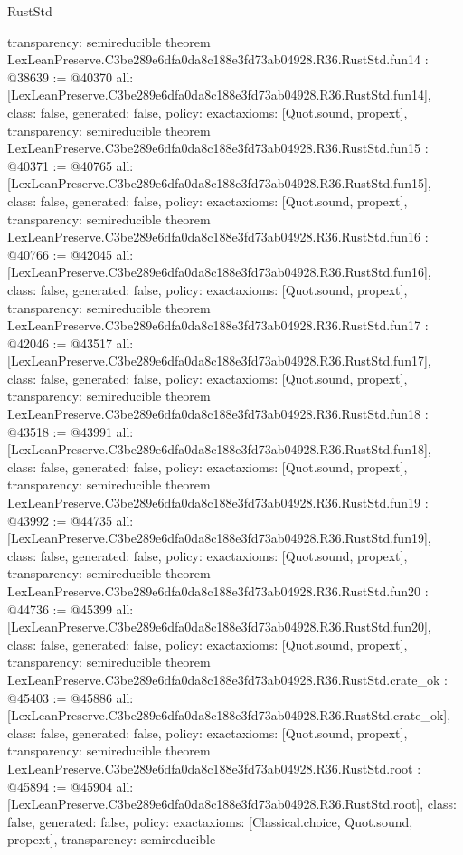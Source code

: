 \begin{lexlean}{RustStd}
\begin{coremodule}
{  transparency: semireducible
}
theorem LexLeanPreserve.C3be289e6dfa0da8c188e3fd73ab04928.R36.RustStd.fun14 : @38639 := @40370 {
  all: [LexLeanPreserve.C3be289e6dfa0da8c188e3fd73ab04928.R36.RustStd.fun14],
  class: false,
  generated: false,
  policy: exact{axioms: [Quot.sound, propext]},
  transparency: semireducible
}
theorem LexLeanPreserve.C3be289e6dfa0da8c188e3fd73ab04928.R36.RustStd.fun15 : @40371 := @40765 {
  all: [LexLeanPreserve.C3be289e6dfa0da8c188e3fd73ab04928.R36.RustStd.fun15],
  class: false,
  generated: false,
  policy: exact{axioms: [Quot.sound, propext]},
  transparency: semireducible
}
theorem LexLeanPreserve.C3be289e6dfa0da8c188e3fd73ab04928.R36.RustStd.fun16 : @40766 := @42045 {
  all: [LexLeanPreserve.C3be289e6dfa0da8c188e3fd73ab04928.R36.RustStd.fun16],
  class: false,
  generated: false,
  policy: exact{axioms: [Quot.sound, propext]},
  transparency: semireducible
}
theorem LexLeanPreserve.C3be289e6dfa0da8c188e3fd73ab04928.R36.RustStd.fun17 : @42046 := @43517 {
  all: [LexLeanPreserve.C3be289e6dfa0da8c188e3fd73ab04928.R36.RustStd.fun17],
  class: false,
  generated: false,
  policy: exact{axioms: [Quot.sound, propext]},
  transparency: semireducible
}
theorem LexLeanPreserve.C3be289e6dfa0da8c188e3fd73ab04928.R36.RustStd.fun18 : @43518 := @43991 {
  all: [LexLeanPreserve.C3be289e6dfa0da8c188e3fd73ab04928.R36.RustStd.fun18],
  class: false,
  generated: false,
  policy: exact{axioms: [Quot.sound, propext]},
  transparency: semireducible
}
theorem LexLeanPreserve.C3be289e6dfa0da8c188e3fd73ab04928.R36.RustStd.fun19 : @43992 := @44735 {
  all: [LexLeanPreserve.C3be289e6dfa0da8c188e3fd73ab04928.R36.RustStd.fun19],
  class: false,
  generated: false,
  policy: exact{axioms: [Quot.sound, propext]},
  transparency: semireducible
}
theorem LexLeanPreserve.C3be289e6dfa0da8c188e3fd73ab04928.R36.RustStd.fun20 : @44736 := @45399 {
  all: [LexLeanPreserve.C3be289e6dfa0da8c188e3fd73ab04928.R36.RustStd.fun20],
  class: false,
  generated: false,
  policy: exact{axioms: [Quot.sound, propext]},
  transparency: semireducible
}
theorem LexLeanPreserve.C3be289e6dfa0da8c188e3fd73ab04928.R36.RustStd.crate_ok : @45403 := @45886 {
  all: [LexLeanPreserve.C3be289e6dfa0da8c188e3fd73ab04928.R36.RustStd.crate_ok],
  class: false,
  generated: false,
  policy: exact{axioms: [Quot.sound, propext]},
  transparency: semireducible
}
theorem LexLeanPreserve.C3be289e6dfa0da8c188e3fd73ab04928.R36.RustStd.root : @45894 := @45904 {
  all: [LexLeanPreserve.C3be289e6dfa0da8c188e3fd73ab04928.R36.RustStd.root],
  class: false,
  generated: false,
  policy: exact{axioms: [Classical.choice, Quot.sound, propext]},
  transparency: semireducible
}


\end{coremodule}
\end{lexlean}
